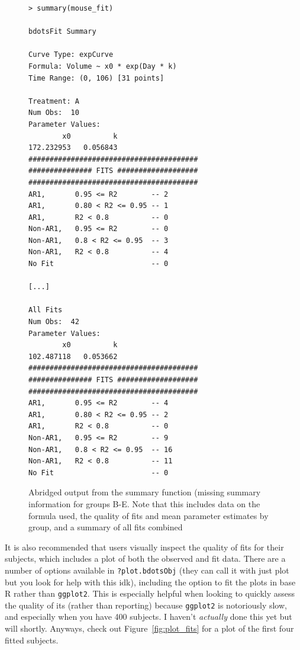 \documentclass{article}
\newcommand{\xt}{\texttt}%
\begin{document}
\begin{singlespace}
\begin{figure}[H]
\centering
\begin{BVerbatim}
> summary(mouse_fit)

bdotsFit Summary

Curve Type: expCurve 
Formula: Volume ~ x0 * exp(Day * k) 
Time Range: (0, 106) [31 points]

Treatment: A 
Num Obs:  10 
Parameter Values: 
        x0          k 
172.232953   0.056843 
########################################
############### FITS ###################
########################################
AR1,       0.95 <= R2        -- 2 
AR1,       0.80 < R2 <= 0.95 -- 1 
AR1,       R2 < 0.8          -- 0 
Non-AR1,   0.95 <= R2        -- 0 
Non-AR1,   0.8 < R2 <= 0.95  -- 3 
Non-AR1,   R2 < 0.8          -- 4 
No Fit                       -- 0 

[...]

All Fits 
Num Obs:  42 
Parameter Values: 
        x0          k 
102.487118   0.053662 
########################################
############### FITS ###################
########################################
AR1,       0.95 <= R2        -- 4 
AR1,       0.80 < R2 <= 0.95 -- 2 
AR1,       R2 < 0.8          -- 0 
Non-AR1,   0.95 <= R2        -- 9 
Non-AR1,   0.8 < R2 <= 0.95  -- 16 
Non-AR1,   R2 < 0.8          -- 11 
No Fit                       -- 0 
\end{BVerbatim}
\caption{Abridged output from the summary function (missing summary information for groups B-E. Note that this includes data on the formula used, the quality of fits and mean parameter estimates by group, and a summary of all fits combined}
\end{figure}
\end{singlespace}

It is also recommended that users visually inspect the quality of fits for their subjects, which includes a plot of both the observed and fit data. There are a number of options available in \xt{?plot.bdotsObj} (they can call it with just plot but you look for help with this idk), including the option to fit the plots in base R rather than \xt{ggplot2}. This is especially helpful when looking to quickly assess the quality of its (rather than reporting) because \xt{ggplot2} is notoriously slow, and especially when you have 400 subjects. I haven't \textit{actually} done this yet but will shortly. Anyways, check out Figure~\ref{fig:plot_fits} for a plot of the first four fitted subjects.
\end{document}
